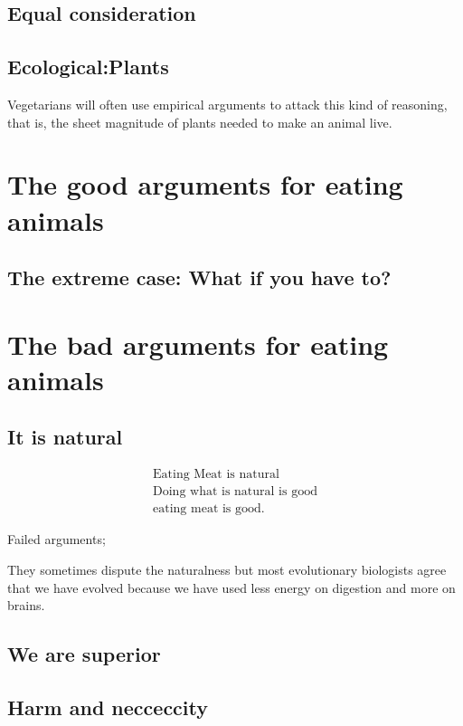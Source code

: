 \documentclass[12pt]{report}
\numberwithin{equation}{section}
\begin{document}
\section{Equal consideration}

\section{Ecological:Plants}

Vegetarians will often use empirical arguments to attack this kind of reasoning, that is, the sheet magnitude of plants needed to make an animal live. 


\chapter{The good arguments for eating animals}

\section{The extreme case: What if you have to?}

\chapter{The bad arguments for eating animals}

\section{It is natural}

\begin{align}
\text{Eating Meat is natural} \\
\text{Doing what is natural is good} \\
\text{eating meat is good.}
\end{align}

Failed arguments;


They sometimes dispute the naturalness but most evolutionary biologists agree that we have evolved because we have used less energy on digestion and more on brains.  

\section{We are superior}




\section{Harm and necceccity}
\end{document}
